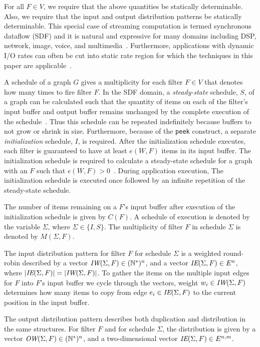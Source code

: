 For all $F \in V$, we require that the above quantities be statically
determinable.  Also, we require that the input and output distribution
patterns be statically determinable.  This special case of streaming
computation is termed synchronous dataflow (SDF) and it is natural and
expressive for many domains including DSP, network, image, voice, and
multimedia~\cite{leeSDF}.  Furthermore, applications with dynamic
I/O rates can often be cut into static rate region for which the
techniques in this paper are applicable~\cite{chen:graphics-hardware:2005}.

A schedule of a graph $G$ gives a multiplicity for each filter $F \in
V$ that denotes how many times to fire filter $F$. In the SDF domain,
a {\it steady-state} schedule, $S$, of a graph can be calculated such
that the quantity of items on each of the filter's input buffer and
output buffer remains unchanged by the complete execution of the
schedule~\cite{lee87}.  Thus this schedule can be repeated
indefinitely because buffers to not grow or shrink in size.
Furthermore, because of the {\tt peek} construct, a separate {\it
initialization} schedule, $I$, is required. After the initialization
schedule executes, each filter is guaranteed to have at least $e(W,
F)$ items in its input buffer. The initialization schedule is required
to calculate a steady-state schedule for a graph with an $F$ such that
$e(W, F) > 0$~\cite{karczmarek:lctes:2003}.  During application
execution, The initialization schedule is executed once followed by an
infinite repetition of the steady-state schedule. 

The number of items remaining on a $F$'s input buffer after execution
of the initialization schedule is given by $C(F)$. A schedule of
execution is denoted by the variable $\Sigma$, where $\Sigma \in
\{I, S\}$.  The multiplicity of filter $F$ in schedule $\Sigma$ is
denoted by $M(\Sigma, F)$.

The input distribution pattern for filter $F$ for schedule $\Sigma$ is
a weighted round-robin described by a vector $\mbox{\it IW}(\Sigma, F) \in
(\mathbb{N}^{*})^n$, and a vector $\mbox{\it IE}(\Sigma, F) \in E^n$, where
$|\mbox{\it IE}(\Sigma, F)| = |\mbox{\it IW}(\Sigma, F)|$. To gather the items on
the multiple input edges for $F$ into $F$'s input buffer we cycle
through the vectors, weight $w_i \in \mbox{\it IW}(\Sigma, F)$ determines
how many items to copy from edge $e_i \in \mbox{\it IE}(\Sigma, F)$ to the
current position in the input buffer.

The output distribution pattern describes both duplication and
distribution in the same structures. For filter $F$ and for schedule
$\Sigma$, the distribution is given by a vector $\mbox{\it OW}(\Sigma, F) \in
(\mathbb{N}^{*})^n$, and a two-dimensional vector $\mbox{\it IE}(\Sigma, F)
\in E^{n,m}$.  


